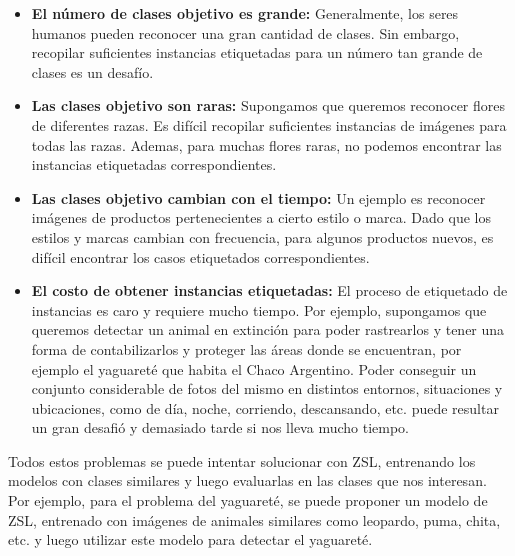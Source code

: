\begin{itemize}
	\item \textbf{El número de clases objetivo es grande:} Generalmente, los seres humanos pueden reconocer una gran cantidad de clases. Sin embargo, recopilar suficientes instancias etiquetadas para un número tan grande de clases es un desafío.
	
	\item \textbf{Las clases objetivo son raras:} Supongamos que queremos reconocer flores de diferentes razas. Es difícil recopilar suficientes instancias de imágenes para todas las razas. Ademas, para muchas flores raras, no podemos encontrar las instancias etiquetadas correspondientes.
	
	\item \textbf{Las clases objetivo cambian con el tiempo:} Un ejemplo es reconocer imágenes de productos pertenecientes a cierto estilo o marca. Dado que los estilos y marcas cambian con frecuencia, para algunos productos nuevos, es difícil encontrar los casos etiquetados correspondientes.
	
	\item \textbf{El costo de obtener instancias etiquetadas:} El proceso de etiquetado de instancias es caro y requiere mucho tiempo. Por ejemplo, supongamos que queremos detectar un animal en extinción para poder rastrearlos y tener una forma de contabilizarlos y proteger las áreas donde se encuentran, por ejemplo el yaguareté que habita el Chaco Argentino. Poder conseguir un conjunto considerable de fotos del mismo en distintos entornos, situaciones y ubicaciones, como de día, noche, corriendo, descansando, etc. puede resultar un gran desafió y demasiado tarde si nos lleva mucho tiempo.
\end{itemize}

Todos estos problemas se puede intentar solucionar con ZSL, entrenando los modelos con clases similares y luego evaluarlas en las clases que nos interesan. Por ejemplo, para el problema del  yaguareté, se puede proponer un modelo de ZSL, entrenado con imágenes de animales similares como leopardo, puma, chita, etc. y luego utilizar este modelo para detectar el yaguareté.\\
 
